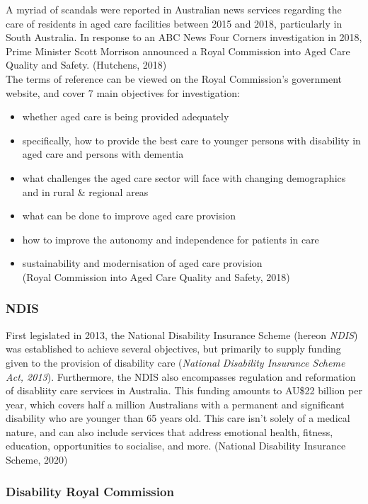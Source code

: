 \documentclass[11pt,]{article}
\providecommand{\tightlist}{%
  \setlength{\itemsep}{0pt}\setlength{\parskip}{0pt}}
\begin{document}
A myriad of scandals were reported in Australian news services regarding
the care of residents in aged care facilities between 2015 and 2018,
particularly in South Australia. In response to an ABC News Four Corners
investigation in 2018, Prime Minister Scott Morrison announced a Royal
Commission into Aged Care Quality and Safety. (Hutchens, 2018)\\
The terms of reference can be viewed on the Royal Commission's
government website, and cover 7 main objectives for investigation:

\begin{itemize}
\tightlist
\item
  whether aged care is being provided adequately
\item
  specifically, how to provide the best care to younger persons with
  disability in aged care and persons with dementia
\item
  what challenges the aged care sector will face with changing
  demographics and in rural \& regional areas
\item
  what can be done to improve aged care provision
\item
  how to improve the autonomy and independence for patients in care
\item
  sustainability and modernisation of aged care provision\\
  (Royal Commission into Aged Care Quality and Safety, 2018)
\end{itemize}

\subsubsection{NDIS}\label{ndis}

First legislated in 2013, the National Disability Insurance Scheme
(hereon \emph{NDIS}) was established to achieve several objectives, but
primarily to supply funding given to the provision of disability care
(\emph{National Disability Insurance Scheme Act, 2013}). Furthermore,
the NDIS also encompasses regulation and reformation of disabliity care
services in Australia. This funding amounts to AU\$22 billion per year,
which covers half a million Australians with a permanent and significant
disability who are younger than 65 years old. This care isn't solely of
a medical nature, and can also include services that address emotional
health, fitness, education, opportunities to socialise, and more.
(National Disability Insurance Scheme, 2020)

\subsubsection{Disability Royal
Commission}\label{disability-royal-commission}
\end{document}
